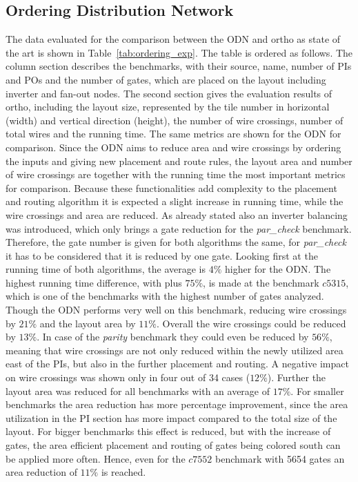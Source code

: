 \subsection{Ordering Distribution Network}
The data evaluated for the comparison between the ODN and ortho as state of the art is shown in Table~\ref{tab:ordering_exp}. The table is ordered as follows. The column section describes the benchmarks, with their source, name, number of PIs and POs and the number of gates, which are placed on the layout including inverter and fan-out nodes. The second section gives the evaluation results of ortho, including the layout size, represented by the tile number in horizontal (width) and vertical direction (height), the number of wire crossings, number of total wires and the running time. The same metrics are shown for the ODN for comparison.
Since the ODN aims to reduce area and wire crossings by ordering the inputs and giving new placement and route rules, the layout area and number of wire crossings are together with the running time the most important metrics for comparison. Because these functionalities add complexity to the placement and routing algorithm it is expected a slight increase in running time, while the wire crossings and area are reduced. As already stated also an inverter balancing was introduced, which only brings a gate reduction for the \textit{par\_check} benchmark. Therefore, the gate number is given for both algorithms the same, for \textit{par\_check} it has to be considered that it is reduced by one gate. Looking first at the running time of both algorithms, the average is $4\%$ higher for the ODN. The highest running time difference, with plus $75\%$, is made at the benchmark $c5315$, which is one of the benchmarks with the highest number of gates analyzed. Though the ODN performs very well on this benchmark, reducing wire crossings by $21\%$ and the layout area by $11\%$. Overall the wire crossings could be reduced by $13\%$. In case of the \textit{parity} benchmark they could even be reduced by $56\%$, meaning that wire crossings are not only reduced within the newly utilized area east of the PIs, but also in the further placement and routing. A negative impact on wire crossings was shown only in four out of 34 cases ($12\%$). Further the layout area was reduced for all benchmarks with an average of $17\%$. For smaller benchmarks the area reduction has more percentage improvement, since the area utilization in the PI section has more impact compared to the total size of the layout. For bigger benchmarks this effect is reduced, but with the increase of gates, the area efficient placement and routing of gates being colored south can be applied more often. Hence, even for the $c7552$ benchmark with 5654 gates an area reduction of $11\%$ is reached.
 
